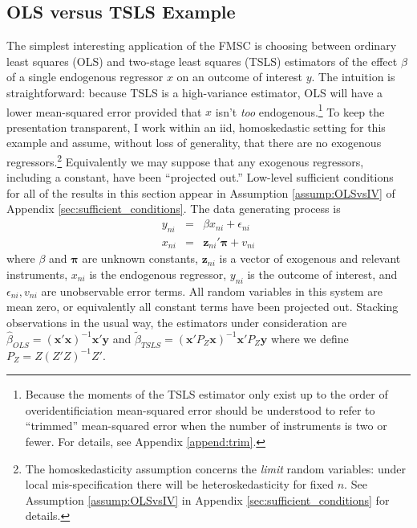 \subsection{OLS versus TSLS Example}
\label{sec:OLSvsIVExample}
The simplest interesting application of the FMSC is choosing between ordinary least squares (OLS) and two-stage least squares (TSLS) estimators of the effect $\beta$ of a single endogenous regressor $x$ on an outcome of interest $y$.
The intuition is straightforward: because TSLS is a high-variance estimator, OLS will have a lower mean-squared error provided that $x$ isn't \emph{too} endogenous.\footnote{Because the moments of the TSLS estimator only exist up to the order of overidentificiation \citep{Phillips1980, Kinal} mean-squared error should be understood to refer to ``trimmed'' mean-squared error when the number of instruments is two or fewer. For details, see Appendix \ref{append:trim}.}
To keep the presentation transparent, I work within an iid, homoskedastic setting for this example and assume, without loss of generality, that there are no exogenous regressors.\footnote{The homoskedasticity assumption concerns the \emph{limit} random variables: under local mis-specification there will be heteroskedasticity for fixed $n$. See Assumption \ref{assump:OLSvsIV} in Appendix \ref{sec:sufficient_conditions} for details.}
Equivalently we may suppose that any exogenous regressors, including a constant, have been ``projected out.''
Low-level sufficient conditions for all of the results in this section appear in Assumption \ref{assump:OLSvsIV} of Appendix \ref{sec:sufficient_conditions}.
The data generating process is
    \begin{eqnarray}
			y_{ni} &=& \beta x_{ni}  + \epsilon_{ni}\\
	x_{ni} &=& \mathbf{z}_{ni}' \boldsymbol{\pi} + v_{ni}
	\end{eqnarray}
where $\beta$ and $\boldsymbol{\pi}$ are unknown constants, $\mathbf{z}_{ni}$ is a vector of exogenous and relevant instruments, $x_{ni}$ is the endogenous regressor, $y_{ni}$ is the outcome of interest, and $\epsilon_{ni}, v_{ni}$ are unobservable error terms.
All random variables in this system are mean zero, or equivalently all constant terms have been projected out. 
Stacking observations in the usual way, the estimators under consideration are $\widehat{\beta}_{OLS} = \left(\mathbf{x}'\mathbf{x}\right)^{-1}\mathbf{x}'\mathbf{y}$ and
$\widetilde{\beta}_{TSLS} = \left(\mathbf{x}'P_Z\mathbf{x}\right)^{-1}\mathbf{x}'P_Z\mathbf{y}$ where we define $P_Z = Z(Z'Z)^{-1}Z'$. 

